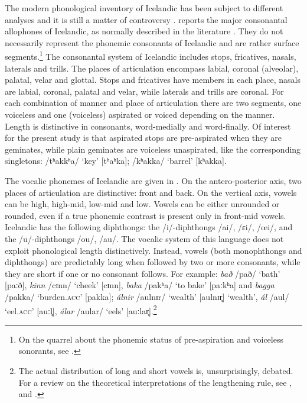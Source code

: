 \documentclass[11pt,a4paper,openany]{memoir}\usepackage[]{graphicx}\usepackage[]{color}
\begin{document}
The modern phonological inventory of Icelandic has been subject to different analyses and it is still a matter of controversy \citep{thraisson1978,jessen1998,arnason2011}.
 reports the major consonantal allophones of Icelandic, as normally described in the literature \citep[98]{arnason2011}.
They do not necessarily represent the phonemic consonants of Icelandic and are rather surface segments.\footnote{
On the quarrel about the phonemic status of pre-aspiration and voiceless sonorants, see \citet{thraisson1978,jessen1998,berg2001,hansson2003,bombien2006}.
}
The consonantal system of Icelandic includes stops, fricatives, nasals, laterals and trills.
The places of articulation encompass labial, coronal (alveolar), palatal, velar and glottal.
Stops and fricatives have members in each place, nasals are labial, coronal, palatal and velar, while laterals and trills are coronal.
For each combination of manner and place of articulation there are two segments, one voiceless and one (voiceless) aspirated or voiced depending on the manner.
Length is distinctive in consonants, word-medially and word-finally.
Of interest for the present study is that aspirated stops are pre-aspirated when they are geminates, while plain geminates are voiceless unaspirated, like the corresponding singletons: /tʰakkʰa/ `key' [tʰaʰka]; /kʰakka/ `barrel' [kʰakka].

The vocalic phonemes of Icelandic are given in  \citep[60]{arnason2011}.
On the antero-posterior axis, two places of articulation are distinctive: front and back.
On the vertical axis, vowels can be high, high-mid, low-mid and low.
Vowels can be either unrounded or rounded, even if a true phonemic contrast is present only in front-mid vowels.
Icelandic has the following diphthongs: the /i/-diphthongs /ai/, /ɛi/, /œi/, and the /u/-diphthongs /ou/, /au/.
The vocalic system of this language does not exploit phonological length distinctively.
Instead, vowels (both monophthongs and diphthongs) are predictably long when followed by two or more consonants, while they are short if one or no consonant follows.
For example: \textit{bað} /pað/ `bath' [paːð], \textit{kinn} /cɪnn/ `cheek' [cɪnn], \textit{baka} /pakʰa/  `to bake' [paːkʰa] and \textit{bagga} /pakka/ `burden.\textsc{acc}' [pakka]; \textit{álnir} /aulnɪr/ `wealth' [aulnɪr̥] ‘wealth’, \textit{ál} /aul/ `eel.\textsc{acc}' [auːl̥], \textit{álar} /aular/ `eels' [auːlar̥].\footnote{The actual distribution of long and short vowels is, unsurprisingly, debated.
For a review on the theoretical interpretations of the lengthening rule, see \citet{booij1986,pind1999}, and \citet[160--173, 203--208]{arnason2011}.
}
\end{document}
